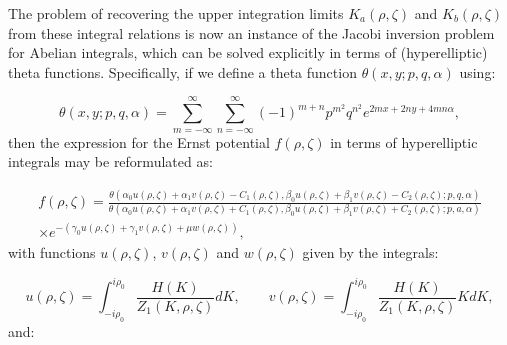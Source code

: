 \documentclass{article}
\begin{document}
The problem of recovering the upper integration limits ${K_a \left( \rho, \zeta \right)}$ and ${K_b \left( \rho, \zeta \right)}$ from these integral relations is now an instance of the Jacobi inversion problem for Abelian integrals, which can be solved explicitly in terms of (hyperelliptic) theta functions\cite{belokolos}\cite{neugebauer4}. Specifically, if we define a theta function ${\theta \left( x, y ; p, q, \alpha \right)}$ using:

\begin{equation}
\theta \left( x, y ; p, q, \alpha \right) = \sum_{m = - \infty}^{\infty} \sum_{n = - \infty}^{\infty} \left( -1 \right)^{m + n} p ^{m^2} q^{n^2} e^{2 m x + 2 n y + 4 m n \alpha},
\end{equation}
then the expression for the Ernst potential ${f \left( \rho, \zeta \right)}$ in terms of hyperelliptic integrals may be reformulated as:

\begin{multline}
f \left( \rho, \zeta \right) = \frac{\theta \left( \alpha_0 u \left( \rho, \zeta \right) + \alpha_1 v \left( \rho, \zeta \right) - C_1 \left( \rho, \zeta \right), \beta_0 u \left( \rho, \zeta \right) + \beta_1 v \left( \rho, \zeta \right) - C_2 \left( \rho, \zeta \right); p, q, \alpha \right)}{\theta \left( \alpha_0 u \left( \rho, \zeta \right) + \alpha_1 v \left( \rho, \zeta \right) + C_1 \left( \rho, \zeta \right), \beta_0 u \left( \rho, \zeta \right) + \beta_1 v \left( \rho, \zeta \right) + C_2 \left( \rho, \zeta \right); p, a, \alpha \right)}\\
\times e^{- \left( \gamma_0 u \left( \rho, \zeta \right) + \gamma_1 v \left( \rho, \zeta \right) + \mu w \left( \rho, \zeta \right) \right)}, 
\end{multline}
with functions ${u \left( \rho, \zeta \right)}$, ${v \left( \rho, \zeta \right)}$ and ${w \left( \rho, \zeta \right)}$ given by the integrals:

\begin{equation}
u \left( \rho, \zeta \right) = \int_{-i \rho_0}^{i \rho_0} \frac{H \left( K \right)}{Z_1 \left( K, \rho, \zeta \right)} dK, \qquad v \left( \rho, \zeta \right) = \int_{-i \rho_0}^{i \rho_0} \frac{H \left( K \right)}{Z_1 \left( K, \rho, \zeta \right)} K dK,
\end{equation}
and:
\end{document}
